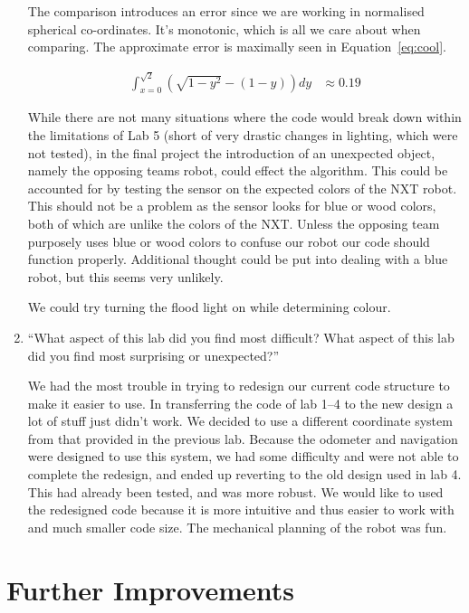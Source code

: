 \documentclass[twocolumn]{article}
\begin{document}
\begin{enumerate}
The comparison introduces an error since we are working in normalised spherical co-ordinates. It's monotonic, which is all we care about when comparing. The approximate error is maximally seen in Equation~\ref{eq:cool}.

\begin{align}
\int_{x=0}^{\sqrt{2}} \left(
	\sqrt{1-y^{2}} - (1 - y)
\right) dy &\approx 0.19
\label{eq:cool}
\end{align}

While there are not many situations where the code would break down within the limitations of Lab 5 (short of very drastic changes in lighting, which were not tested), in the final project the introduction of an unexpected object, namely the opposing teams robot, could effect the algorithm. This could be accounted for by testing the sensor on the expected colors of the NXT robot. This should not be a problem as the sensor looks for blue or wood colors, both of which are unlike the colors of the NXT. Unless the opposing team purposely uses blue or wood colors to confuse our robot our code should function properly. Additional thought could be put into dealing with a blue robot, but this seems very unlikely.

We could try turning the flood light on while determining colour.

\item ``What aspect of this lab did you find most difficult? What aspect of this lab did you find most surprising or unexpected?''

We had the most trouble in trying to redesign our current code structure to make it easier to use. In transferring the code of lab 1--4\cite{alexneil1,alexneil2,alexneil3,alexneil4} to the new design a lot of stuff just didn't work. We decided to use a different coordinate system from that provided in the previous lab\cite{iso}. Because the odometer and navigation were designed to use this system, we had some difficulty and were not able to complete the redesign, and ended up reverting to the old design used in lab 4. This had already been tested, and was more robust. We would like to used the redesigned code because it is more intuitive and thus easier to work with and much smaller code size. The mechanical planning of the robot was fun.

\end{enumerate}

\section{Further Improvements}
\end{document}
